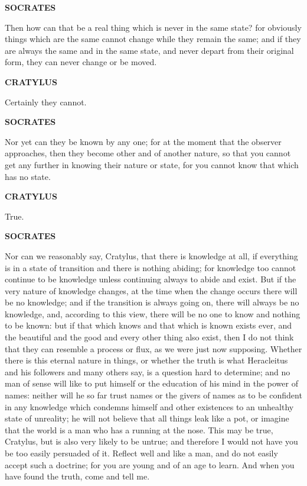 \documentclass[11pt,letter]{article}
\begin{document}
\par \textbf{SOCRATES}
\par   Then how can that be a real thing which is never in the same state? for obviously things which are the same cannot change while they remain the same; and if they are always the same and in the same state, and never depart from their original form, they can never change or be moved.

\par \textbf{CRATYLUS}
\par   Certainly they cannot.

\par \textbf{SOCRATES}
\par   Nor yet can they be known by any one; for at the moment that the observer approaches, then they become other and of another nature, so that you cannot get any further in knowing their nature or state, for you cannot know that which has no state.

\par \textbf{CRATYLUS}
\par   True.

\par \textbf{SOCRATES}
\par   Nor can we reasonably say, Cratylus, that there is knowledge at all, if everything is in a state of transition and there is nothing abiding; for knowledge too cannot continue to be knowledge unless continuing always to abide and exist. But if the very nature of knowledge changes, at the time when the change occurs there will be no knowledge; and if the transition is always going on, there will always be no knowledge, and, according to this view, there will be no one to know and nothing to be known:  but if that which knows and that which is known exists ever, and the beautiful and the good and every other thing also exist, then I do not think that they can resemble a process or flux, as we were just now supposing. Whether there is this eternal nature in things, or whether the truth is what Heracleitus and his followers and many others say, is a question hard to determine; and no man of sense will like to put himself or the education of his mind in the power of names:  neither will he so far trust names or the givers of names as to be confident in any knowledge which condemns himself and other existences to an unhealthy state of unreality; he will not believe that all things leak like a pot, or imagine that the world is a man who has a running at the nose. This may be true, Cratylus, but is also very likely to be untrue; and therefore I would not have you be too easily persuaded of it. Reflect well and like a man, and do not easily accept such a doctrine; for you are young and of an age to learn. And when you have found the truth, come and tell me.
\end{document}
